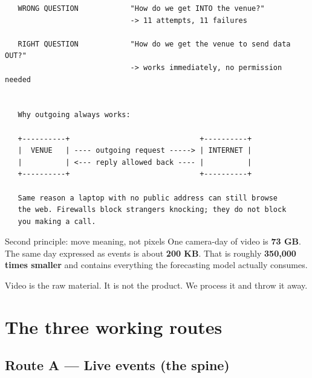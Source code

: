 \documentclass[11pt,a4paper]{article}
\begin{document}
\begin{verbatim}
   WRONG QUESTION            "How do we get INTO the venue?"
                             -> 11 attempts, 11 failures

   RIGHT QUESTION            "How do we get the venue to send data OUT?"
                             -> works immediately, no permission needed


   Why outgoing always works:

   +----------+                              +----------+
   |  VENUE   | ---- outgoing request -----> | INTERNET |
   |          | <--- reply allowed back ---- |          |
   +----------+                              +----------+

   Same reason a laptop with no public address can still browse
   the web. Firewalls block strangers knocking; they do not block
   you making a call.
\end{verbatim}

\begin{note}{Second principle: move meaning, not pixels}
One camera-day of video is \textbf{73 GB}. The same day expressed as
events is about \textbf{200 KB}. That is roughly \textbf{350{,}000 times
smaller} and contains everything the forecasting model actually consumes.

\vspace{4pt}
Video is the raw material. It is not the product. We process it and
throw it away.
\end{note}

\section{The three working routes}

\subsection{Route A --- Live events (the spine)}
\end{document}
